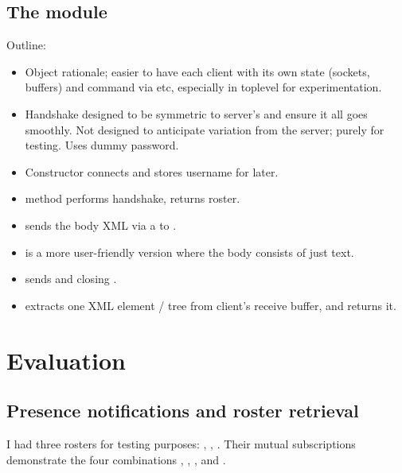 \documentclass[12pt,a4paper,twoside,openright]{report}
\begin{document}
{\section{The  module}\label{sec:mod-client}
Outline:

\begin{itemize}
  \item Object rationale; easier to have each client with its own state (sockets, buffers) and command via  etc, especially in toplevel for experimentation.

  \item Handshake designed to be symmetric to server's and ensure it all goes smoothly. Not designed to anticipate variation from the server; purely for testing. Uses dummy password.

  \item Constructor  connects and stores username for later.

  \item {} method performs handshake, returns roster.

  \item {} sends the body XML via a  to .

  \item {} is a more user-friendly version where the body consists of just text.

  \item {} sends  and closing .

  \item {} extracts one XML element / tree from client's receive buffer, and returns it.

\end{itemize}


\chapter{Evaluation}
\section{Presence notifications and roster retrieval}
I had three rosters for testing purposes: , , . Their mutual subscriptions demonstrate the four combinations , , , and .

}
\end{document}
